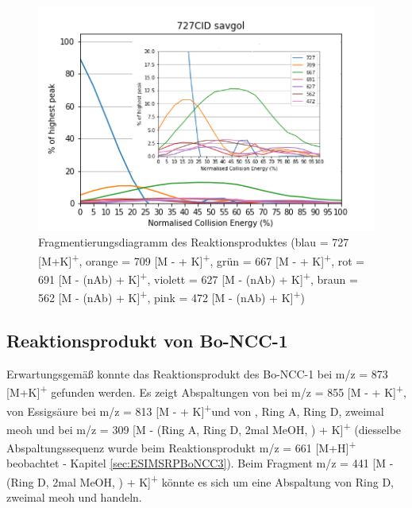 \begin{figure}[!htbp]
  \centering
  \includegraphics[scale=0.7]{figures/Kapitel4/Kataboliten/diags/727CID-savgol.png}
  \caption[Fragmentierungsdiagramm des Reaktionsproduktes von Bo-DNCC, Quelle: Autor]{Fragmentierungsdiagramm des Reaktionsproduktes (blau = 727 [M+K]\textsuperscript{+}, orange = 709 [M -  + K]\textsuperscript{+}, grün = 667 [M -  + K]\textsuperscript{+}, rot = 691 [M - (\gls{nAb}) + K]\textsuperscript{+}, violett = 627 [M - (\gls{nAb}) + K]\textsuperscript{+}, braun = 562 [M - (\gls{nAb}) + K]\textsuperscript{+}, pink = 472 [M - (\gls{nAb}) + K]\textsuperscript{+})}
  \label{fig:727MKLeafspraydiags}
\end{figure}



\subsection{Reaktionsprodukt von Bo-NCC-1}

Erwartungsgemäß konnte das Reaktionsprodukt des Bo-NCC-1 bei m/z = 873 [M+K]\textsuperscript{+} gefunden werden. Es zeigt Abspaltungen von  bei m/z = 855 [M -  + K]\textsuperscript{+}, von Essigsäure bei m/z = 813 [M -  + K]\textsuperscript{+}und von , Ring A, Ring D, zweimal \gls{meoh} und  bei m/z = 309 [M - (Ring A, Ring D, 2mal MeOH, )  + K]\textsuperscript{+} (diesselbe Abspaltungssequenz wurde beim Reaktionsprodukt m/z = 661 [M+H]\textsuperscript{+} beobachtet - Kapitel \ref{sec:ESIMSRPBoNCC3}). Beim Fragment m/z = 441 [M - (Ring D, 2mal MeOH, ) + K]\textsuperscript{+} könnte es sich um eine Abspaltung von Ring D, zweimal \gls{meoh} und  handeln. 

